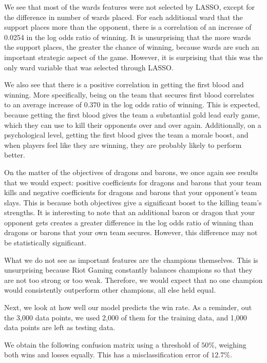 \documentclass[runningheads]{llncs}
\begin{document}
	We see that most of the wards features were not selected by LASSO, except for the difference in number of wards placed. For each additional ward that the support places more than the opponent, there is a correlation of an increase of 0.0254 in the log odds ratio of winning. It is unsurprising that the more wards the support places, the greater the chance of winning, because wards are such an important strategic aspect of the game. However, it is surprising that this was the only ward variable that was selected through LASSO.

	We also see that there is a positive correlation in getting the first blood and winning. More specifically, being on the team that secures first blood correlates to an average increase of 0.370 in the log odds ratio of winning. This is expected, because getting the first blood gives the team a substantial gold lead early game, which they can use to kill their opponents over and over again. Additionally, on a psychological level, getting the first blood gives the team a morale boost, and when players feel like they are winning, they are probably likely to perform better.

	On the matter of the objectives of dragons and barons, we once again see results that we would expect: positive coefficients for dragons and barons that your team kills and negative coefficients for dragons and barons that your opponent’s team slays. This is because both objectives give a significant boost to the killing team’s strengths. It is interesting to note that an additional baron or dragon that your opponent gets creates a greater difference in the log odds ratio of winning than dragons or barons that your own team secures. However, this difference may not be statistically significant.

	What we do not see as important features are the champions themselves. This is unsurprising because Riot Gaming constantly balances champions so that they are not too strong or too weak. Therefore, we would expect that no one champion would consistently outperform other champions, all else held equal.

	Next, we look at how well our model predicts the win rate. As a reminder, out the 3,000 data points, we used 2,000 of them for the training data, and 1,000 data points are left as testing data.

	We obtain the following confusion matrix using a threshold of $50\%$, weighing both wins and losses equally. This has a misclassification error of $12.7\%$.
\end{document}
